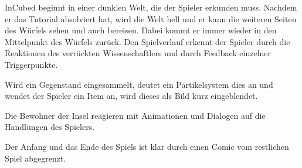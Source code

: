
InCubed beginnt in einer dunklen Welt, die der Spieler erkunden muss. Nachdem er das Tutorial absolviert hat, wird die Welt hell und er kann die weiteren Seiten des Würfels sehen und auch bereisen. Dabei kommt er immer wieder in den Mittelpunkt des Würfels zurück. Den Spielverlauf erkennt der Spieler durch die Reaktionen des verrückten Wissenschaftlers und durch Feedback einzelner Triggerpunkte.

Wird ein Gegenstand eingesammelt, deutet ein Partikelsystem dies an und wendet der Spieler ein Item an, wird dieses als Bild kurz eingeblendet.

Die Bewohner der Insel reagieren mit Animationen und Dialogen auf die Handlungen des Spielers.

Der Anfang und das Ende des Spiels ist klar durch einen Comic vom restlichen Spiel abgegrenzt.